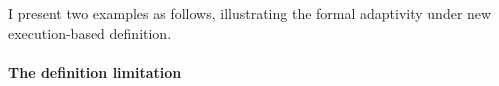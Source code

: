 I present two examples as follows, illustrating the formal adaptivity under new execution-based
definition.


\paragraph{The definition limitation}
